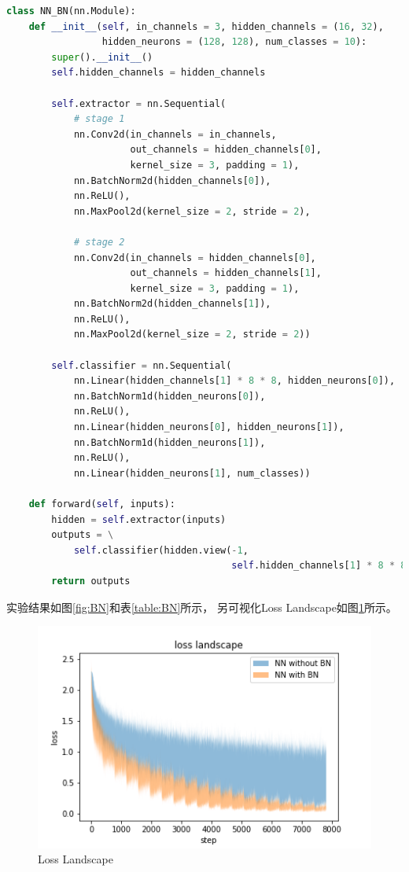 \documentclass{article}
\begin{document}
\begin{lstlisting}[language=Python]
class NN_BN(nn.Module):
    def __init__(self, in_channels = 3, hidden_channels = (16, 32),
                 hidden_neurons = (128, 128), num_classes = 10):
        super().__init__()
        self.hidden_channels = hidden_channels

        self.extractor = nn.Sequential(
            # stage 1
            nn.Conv2d(in_channels = in_channels,
                      out_channels = hidden_channels[0],
                      kernel_size = 3, padding = 1),
            nn.BatchNorm2d(hidden_channels[0]),
            nn.ReLU(),
            nn.MaxPool2d(kernel_size = 2, stride = 2),

            # stage 2
            nn.Conv2d(in_channels = hidden_channels[0],
                      out_channels = hidden_channels[1],
                      kernel_size = 3, padding = 1),
            nn.BatchNorm2d(hidden_channels[1]),
            nn.ReLU(),
            nn.MaxPool2d(kernel_size = 2, stride = 2))

        self.classifier = nn.Sequential(
            nn.Linear(hidden_channels[1] * 8 * 8, hidden_neurons[0]),
            nn.BatchNorm1d(hidden_neurons[0]),
            nn.ReLU(),
            nn.Linear(hidden_neurons[0], hidden_neurons[1]),
            nn.BatchNorm1d(hidden_neurons[1]),
            nn.ReLU(),
            nn.Linear(hidden_neurons[1], num_classes))

    def forward(self, inputs):
        hidden = self.extractor(inputs)
        outputs = \
            self.classifier(hidden.view(-1,
                                        self.hidden_channels[1] * 8 * 8))
        return outputs
\end{lstlisting}

实验结果如图\ref{fig:BN}和表\ref{table:BN}所示，
另可视化Loss Landscape如图\ref{fig:LL}所示。

\begin{figure}[h]
\includegraphics[width=\textwidth]
{Result/NN BN 0.0005/figure.png}
\caption{Loss Landscape}
\label{fig:LL}
\end{figure}
\end{document}
